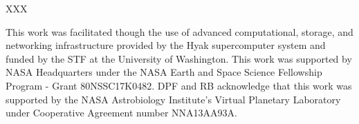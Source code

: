 \documentclass[twocolumn]{aastex61}
\begin{document}
XXX

\acknowledgments
This work was facilitated though the use of advanced computational, storage, and networking infrastructure provided by the Hyak supercomputer system and funded by the STF at the University of Washington. This work was supported by NASA Headquarters under the NASA Earth and Space Science Fellowship Program - Grant 80NSSC17K0482.  DPF and RB acknowledge that this work was supported by the NASA Astrobiology Institute's Virtual Planetary Laboratory under Cooperative Agreement number NNA13AA93A. 



\end{document}
